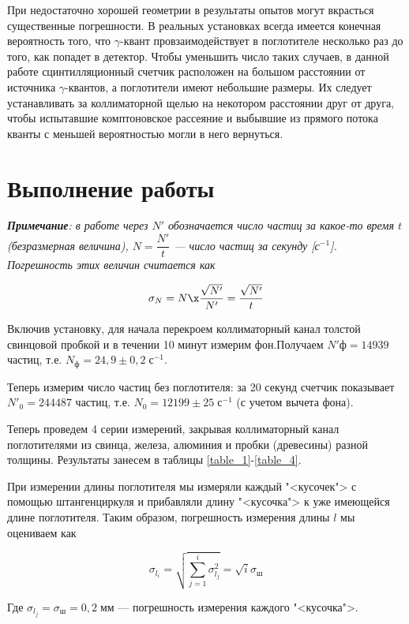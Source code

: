 \documentclass[12pt]{kiarticle}
\newcommand{\ga}{\ensuremath{\gamma}}
\begin{document}
При недостаточно хорошей геометрии в результаты опытов могут
вкрасться существенные погрешности. В реальных установках всегда имеется конечная вероятность того, что \ga-квант провзаимодействует в
поглотителе несколько раз до того, как попадет в детектор. Чтобы уменьшить число таких случаев, в данной работе сцинтилляционный счетчик расположен на большом расстоянии от источника \ga-квантов, а поглотители имеют небольшие
размеры. Их следует устанавливать за коллиматорной щелью на некотором расстоянии друг от друга, чтобы испытавшие комптоновское
рассеяние и выбывшие из прямого потока кванты с меньшей вероятностью могли в него вернуться.

\section{Выполнение работы}

 \textit{\textbf{Примечание}: в работе через $ N' $ обозначается число частиц за какое-то время $ t $ (безразмерная величина), $ N = \dfrac{N'}{t} $ --- число частиц за секунду [с$ ^{-1} $]. Погрешность этих величин считается как} 
 
 \begin{equation}\label{}
 \sigma_N = N \x \dfrac{\sqrt{N'}}{N'} = \dfrac{\sqrt{N'}}{t}
 \end{equation}

Включив установку, для начала перекроем коллиматорный канал толстой свинцовой пробкой и в течении 10 минут измерим фон.Получаем $ N'ф = 14939 $ частиц, т.е. $ N_ф = 24,9 \pm 0,2 \; с^{-1} $.

Теперь измерим число частиц без поглотителя: за 20 секунд счетчик показывает $ N'_0 = 244487 $ частиц, т.е. $ N_0 = 12199 \pm 25 \; с^{-1}$ (с учетом вычета фона). 

Теперь проведем 4 серии измерений, закрывая коллиматорный канал поглотителями из свинца, железа, алюминия и пробки (древесины) разной толщины. Результаты занесем в таблицы \ref{table_1}-\ref{table_4}. 

При измерении длины поглотителя мы измеряли каждый "<кусочек"> с помощью штангенциркуля и прибавляли длину "<кусочка"> к уже имеющейся длине поглотителя. Таким образом,  погрешность измерения длины $ l $ мы оцениваем как

\begin{equation}\label{}
\sigma_{l_i} = \sqrt{\sum\limits_{j=1}^i \sigma_{l_j}^2} = \sqrt{i}\sigma_ш
\end{equation}

Где $ \sigma_{l_j} = \sigma_ш = 0,2 \;мм $ --- погрешность измерения каждого "<кусочка">. 
\end{document}
